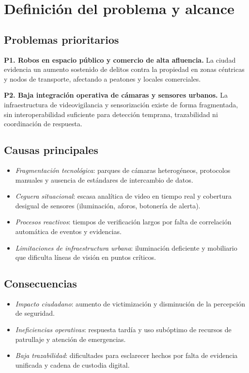 \documentclass[12pt,a4paper]{article}
\begin{document}
\section{Definición del problema y alcance}

\subsection*{Problemas prioritarios}
\textbf{P1. Robos en espacio público y comercio de alta afluencia.} La ciudad evidencia un aumento sostenido de delitos contra la propiedad en zonas céntricas y nodos de transporte, afectando a peatones y locales comerciales.

\textbf{P2. Baja integración operativa de cámaras y sensores urbanos.} La infraestructura de videovigilancia y sensorización existe de forma fragmentada, sin interoperabilidad suficiente para detección temprana, trazabilidad ni coordinación de respuesta.

\subsection*{Causas principales}
\begin{itemize}
    \item \textit{Fragmentación tecnológica}: parques de cámaras heterogéneos, protocolos manuales y ausencia de estándares de intercambio de datos.
    \item \textit{Ceguera situacional}: escasa analítica de video en tiempo real y cobertura desigual de sensores (iluminación, aforos, botonería de alerta).
    \item \textit{Procesos reactivos}: tiempos de verificación largos por falta de correlación automática de eventos y evidencias.
    \item \textit{Limitaciones de infraestructura urbana}: iluminación deficiente y mobiliario que dificulta líneas de visión en puntos críticos.
\end{itemize}

\subsection*{Consecuencias}
\begin{itemize}
    \item \textit{Impacto ciudadano}: aumento de victimización y disminución de la percepción de seguridad.
    \item \textit{Ineficiencias operativas}: respuesta tardía y uso subóptimo de recursos de patrullaje y atención de emergencias.
    \item \textit{Baja trazabilidad}: dificultades para esclarecer hechos por falta de evidencia unificada y cadena de custodia digital.
\end{itemize}
\end{document}
